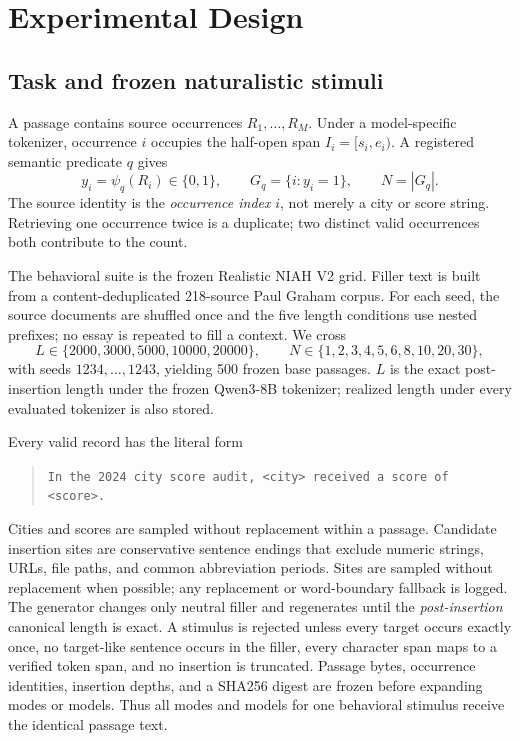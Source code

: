 \section{Experimental Design}
\label{sec:design}

\subsection{Task and frozen naturalistic stimuli}

A passage contains source occurrences \(R_1,\ldots,R_M\). Under a model-specific
tokenizer, occurrence \(i\) occupies the half-open span \(I_i=[s_i,e_i)\). A
registered semantic predicate \(q\) gives
\begin{equation}
  y_i=\psi_q(R_i)\in\{0,1\},\qquad
  G_q=\{i:y_i=1\},\qquad N=|G_q|.
\label{eq:task}
\end{equation}
The source identity is the \emph{occurrence index} \(i\), not merely a city or
score string. Retrieving one occurrence twice is a duplicate; two distinct
valid occurrences both contribute to the count.

The behavioral suite is the frozen Realistic NIAH V2 grid. Filler text is
built from a content-deduplicated 218-source Paul Graham corpus. For each seed,
the source documents are shuffled once and the five length conditions use
nested prefixes; no essay is repeated to fill a context. We cross
\[
  L\in\{2000,3000,5000,10000,20000\},\qquad
  N\in\{1,2,3,4,5,6,8,10,20,30\},
\]
with seeds \(1234,\ldots,1243\), yielding 500 frozen base passages. \(L\) is
the exact post-insertion length under the frozen Qwen3-8B tokenizer; realized
length under every evaluated tokenizer is also stored.

Every valid record has the literal form
\begin{quote}\small
\texttt{In the 2024 city score audit, <city> received a score of <score>.}
\end{quote}
Cities and scores are sampled without replacement within a passage. Candidate
insertion sites are conservative sentence endings that exclude numeric
strings, URLs, file paths, and common abbreviation periods. Sites are sampled
without replacement when possible; any replacement or word-boundary fallback
is logged. The generator changes only neutral filler and regenerates until the
\emph{post-insertion} canonical length is exact. A stimulus is rejected unless
every target occurs exactly once, no target-like sentence occurs in the
filler, every character span maps to a verified token span, and no insertion
is truncated. Passage bytes, occurrence identities, insertion depths, and a
SHA256 digest are frozen before expanding modes or models. Thus all modes and
models for one behavioral stimulus receive the identical passage text.

